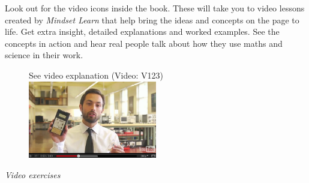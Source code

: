 {\Large

Look out for the video icons inside the book. These will take you to video lessons created by \textit{Mindset
Learn} that help bring the ideas and concepts on the page to life. Get extra insight, detailed
explanations and worked examples. See the concepts in action and hear real people talk about how they
use maths and science in their work. \par

\begin{figure}[h]
\begin{center}
See video explanation  (Video: V123)\\
\includegraphics[width=0.5\textwidth]{title_images/veritasiumvideo.png}
\end{center}
\end{figure}

}
\vspace{0.5cm}
{\normalfont\sffamily\fontsize{22}\normalfont\itshape Video exercises} \par

